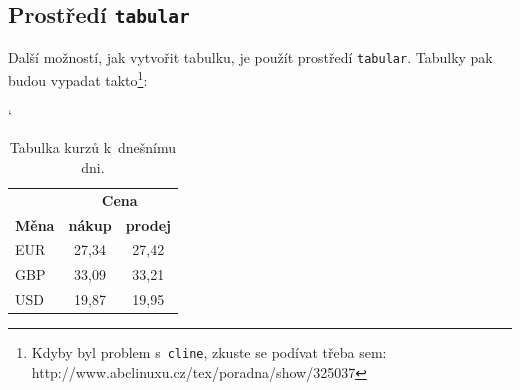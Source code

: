\documentclass[11pt, a4paper, czech]{article}
\begin{document}
\subsection{Prostředí \texttt{tabular}}
Další možností, jak vytvořit tabulku, je použít prostředí \texttt{tabular}. Tabulky pak budou vypadat takto\footnote{Kdyby byl problem s~\texttt{cline}, zkuste se podívat třeba sem: http://www.abclinuxu.cz/tex/poradna/show/325037}:
\bigskip
\begin{table}[h]
\catcode` 
	\begin{center}
		\begin{tabular}{| l | c | c |} \hline
		    & \multicolumn{2}{|c|}{\textbf{Cena}}\\\cline{2-3}
		    \textbf{Měna} & \textbf{nákup} & \textbf{prodej} \\ \hline
		    EUR & 27,34 & 27,42 \\ 
		    GBP & 33,09 & 33,21 \\ 
		    USD & 19,87 & 19,95 \\ \hline
		\end{tabular}
		\caption{Tabulka kurzů k~dnešnímu dni.}
		\label{tabulka1}
	\end{center}
\end{table}
\end{document}
